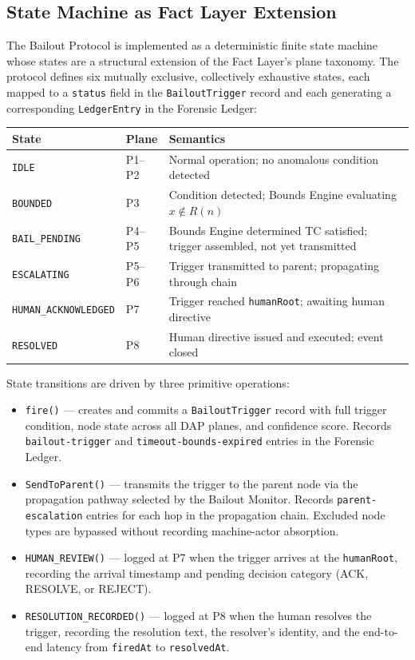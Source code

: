 \subsection{State Machine as Fact Layer Extension}
\label{sec:state-machine-extension}

The Bailout Protocol is implemented as a deterministic finite state machine whose states are a structural extension of the Fact Layer's plane taxonomy. The protocol defines six mutually exclusive, collectively exhaustive states, each mapped to a \texttt{status} field in the \texttt{BailoutTrigger} record and each generating a corresponding \texttt{LedgerEntry} in the Forensic Ledger:

\bigskip
\noindent
\begin{tabular}{llp{6.5cm}}
  \hline
  \textbf{State} & \textbf{Plane} & \textbf{Semantics} \\
  \hline
  \texttt{IDLE}            & P1--P2 & Normal operation; no anomalous condition detected \\
  \texttt{BOUNDED}          & P3     & Condition detected; Bounds Engine evaluating $x \notin R(n)$ \\
  \texttt{BAIL\_PENDING}    & P4--P5 & Bounds Engine determined TC satisfied; trigger assembled, not yet transmitted \\
  \texttt{ESCALATING}       & P5--P6 & Trigger transmitted to parent; propagating through chain \\
  \texttt{HUMAN\_ACKNOWLEDGED} & P7 & Trigger reached \texttt{humanRoot}; awaiting human directive \\
  \texttt{RESOLVED}         & P8     & Human directive issued and executed; event closed \\
  \hline
\end{tabular}
\bigskip

State transitions are driven by three primitive operations:

\begin{itemize}
  \item \texttt{fire()} — creates and commits a \texttt{BailoutTrigger} record with full trigger condition, node state across all DAP planes, and confidence score. Records \texttt{bailout-trigger} and \texttt{timeout-bounds-expired} entries in the Forensic Ledger.
  \item \texttt{SendToParent()} — transmits the trigger to the parent node via the propagation pathway selected by the Bailout Monitor. Records \texttt{parent-escalation} entries for each hop in the propagation chain. Excluded node types are bypassed without recording machine-actor absorption.
  \item \texttt{HUMAN\_REVIEW()} — logged at P7 when the trigger arrives at the \texttt{humanRoot}, recording the arrival timestamp and pending decision category (ACK, RESOLVE, or REJECT).
  \item \texttt{RESOLUTION\_RECORDED()} — logged at P8 when the human resolves the trigger, recording the resolution text, the resolver's identity, and the end-to-end latency from \texttt{firedAt} to \texttt{resolvedAt}.
\end{itemize}

